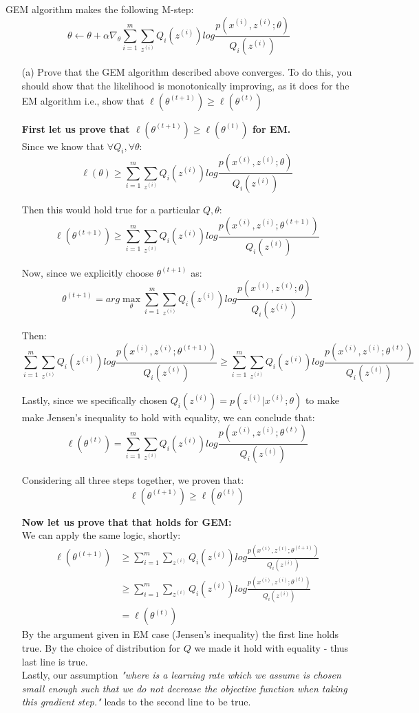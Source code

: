 \documentclass{article}
\newcommand{\ith}{^{(i)}}
\begin{document}
GEM algorithm makes the following M-step:
$$ \theta \leftarrow \theta + \alpha \nabla_\theta \sum_{i=1}^{m} \sum_{z\ith}^{} Q_i(z\ith) 
	log \frac{p(x\ith, z\ith; \theta)}{Q_i(z\ith)} $$
	
\begin{itemize}
	\item[(a)] Prove that the GEM algorithm described above converges. To do this, you should show that the likelihood is monotonically improving, as it does for the EM algorithm i.e., show that $\ell (\theta^{(t+1)}) \ge \ell(\theta^{(t)})$
	
	\textbf{First let us prove that $\ell (\theta^{(t+1)}) \ge \ell(\theta^{(t)})$ for EM.}\\
	Since we know that $\forall Q_i, \forall \theta$:
	$$\ell(\theta) \ge \sum_{i=1}^{m} \sum_{z\ith}^{} Q_i(z\ith) 
	log \frac{p(x\ith, z\ith; \theta)}{Q_i(z\ith)} $$
	
	Then this would hold true for a particular $Q, \theta$:
	$$\ell(\theta^{(t+1)}) \ge \sum_{i=1}^{m} \sum_{z\ith}^{} Q_i(z\ith) 
	log \frac{p(x\ith, z\ith; \theta^{(t+1)})}{Q_i(z\ith)} $$
	
	Now, since we explicitly choose $\theta^{(t+1)}$ as:
	$$ \theta^{(t+1)} = arg \max_{\theta} \sum_{i=1}^{m} \sum_{z\ith}^{} Q_i(z\ith) 
	log \frac{p(x\ith, z\ith; \theta)}{Q_i(z\ith)} $$
	
	Then:
	$$\sum_{i=1}^{m} \sum_{z\ith}^{} Q_i(z\ith) 
	log \frac{p(x\ith, z\ith; \theta^{(t+1)})}{Q_i(z\ith)} \ge
	\sum_{i=1}^{m} \sum_{z\ith}^{} Q_i(z\ith) 
	log \frac{p(x\ith, z\ith; \theta^{(t)})}{Q_i(z\ith)} $$
	
	Lastly, since we specifically chosen $Q_i(z\ith)  = p(z\ith | x \ith; \theta)$ to make make Jensen's inequality to hold with equality, we can conclude that:
	$$	\ell(\theta^{(t)}) = \sum_{i=1}^{m} \sum_{z\ith}^{} Q_i(z\ith) 
	log \frac{p(x\ith, z\ith; \theta^{(t)})}{Q_i(z\ith)} $$
	
	Considering all three steps together, we proven that:
	$$\ell(\theta^{(t+1)}) \ge \ell(\theta^{(t)})$$
	
	\textbf{Now let us prove that that holds for GEM:}\\
	We can apply the same logic, shortly:
	\begin{align*}
	\ell(\theta^{(t+1)})  &\ge 
	\sum_{i=1}^{m} \sum_{z\ith}^{} Q_i(z\ith) 
	log \frac{p(x\ith, z\ith; \theta^{(t+1)})}{Q_i(z\ith)}\\ &\ge
	\sum_{i=1}^{m} \sum_{z\ith}^{} Q_i(z\ith) 
	log \frac{p(x\ith, z\ith; \theta^{(t)})}{Q_i(z\ith)}\\ &= 
	\ell(\theta^{(t)})	
	\end{align*}
	By the argument given in EM case (Jensen's inequality) the first line holds true. By the choice of distribution for $Q$ we made it hold with equality - thus last line is true. \\
	Lastly, our assumption \textit{"where is a learning rate which we assume is chosen small enough such that we do not decrease the objective function when taking this gradient step."} leads to the second line to be true. 
	

\end{itemize}
\end{document}

